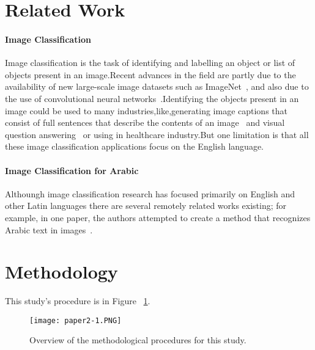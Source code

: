 \documentclass[10pt,twocolumn,letterpaper]{article}
\begin{document}
	
\section{Related Work}	
\paragraph{Image Classification}\par
Image classification is the task of identifying and labelling an object or list of objects present in an image.Recent advances in the field are partly due to the availability of new large-scale image datasets such as ImageNet~\cite{ImageNet2009_2}, and also due to the use of convolutional neural networks~\cite{convolutional2017_3}.Identifying the objects present in an image could be used to many industries,like,generating image captions that consist of full sentences that describe the contents of an image~\cite{Visual2015_4} and visual question answering~\cite{Visual2017_5} or using in healthcare industry.But one limitation is that all these image classification applications focus on the English language.
\paragraph{Image Classification for Arabic}\par
Althoungh image classification research has focused primarily on English and other Latin languages there are several remotely related works existing; for example,
in one paper, the authors attempted to create a method that recognizes Arabic text in images~\cite{resolution2013_6}.
\section{Methodology}
This study’s procedure is in Figure ~\ref{fig:activefunction}.
\begin{figure}[htb]
\centering
\texttt{[image: paper2-1.PNG]}
\caption{Overview of the methodological procedures for this study.}
\label{fig:activefunction}
\end{figure}
\end{document}
